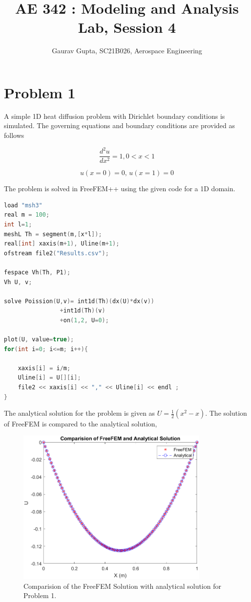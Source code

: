\documentclass[11pt]{article} %
\title{AE 342 : Modeling and Analysis Lab, Session 4}
\author{Gaurav Gupta, SC21B026, Aerospace Engineering}
\begin{document}
\maketitle

\section{Problem 1}
A simple 1D heat diffusion problem with Dirichlet boundary conditions is simulated. The governing equations and boundary conditions are provided as follows

\begin{equation}
\frac{d^2u}{dx^2} = 1, 0 < x < 1 
\end{equation}

\begin{equation}
u(x=0) = 0 \text{,  } u(x=1) = 0 
\end{equation}

The problem is solved in FreeFEM++ using the given code for a 1D domain. 

\begin{lstlisting}[language=C++, caption=Problem 1 Code ]
load "msh3"
real m = 100;
int l=1;
meshL Th = segment(m,[x*l]);
real[int] xaxis(m+1), Uline(m+1);
ofstream file2("Results.csv");

fespace Vh(Th, P1);
Vh U, v;

solve Poission(U,v)= int1d(Th)(dx(U)*dx(v))
				+int1d(Th)(v)
				+on(1,2, U=0);

plot(U, value=true);
for(int i=0; i<=m; i++){
	
	xaxis[i] = i/m;
	Uline[i] = U[][i];
	file2 << xaxis[i] << "," << Uline[i] << endl ;
}
\end{lstlisting}

The analytical solution for the problem is given as $U = \frac{1}{2}(x^2 - x)$. The solution of FreeFEM is compared to the analytical solution, 

\begin{figure}[H]
\centering
\includegraphics[width=0.85\textwidth]{q1.png}
\caption{Comparision of the FreeFEM Solution with analytical solution for Problem 1.}
\end{figure}
\end{document}
